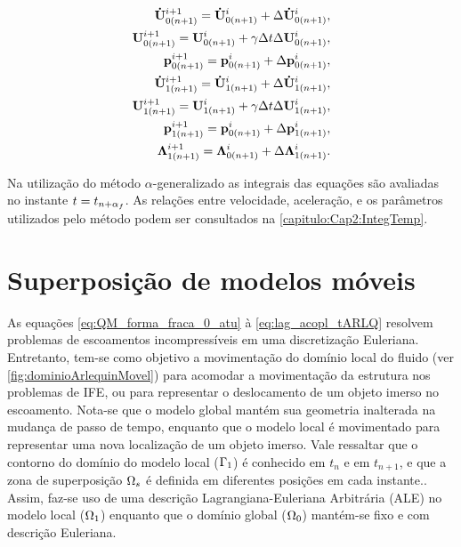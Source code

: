 \begin{align}
	\mathbf{\dot{U}}_{0(n+1)}^{i+1} = \mathbf{\dot{U}}_{0(n+1)}^{i} + \Delta\mathbf{\dot{U}}_{0(n+1)}^{i}, \label{eq:atu_acel_0} \\ 
	\mathbf{U}_{0(n+1)}^{i+1} = \mathbf{U}_{0(n+1)}^{i} + \gamma \Delta t \Delta\mathbf{U}_{0(n+1)}^{i},\label{eq:atu_vel_0}\\
	\mathbf{p}_{0(n+1)}^{i+1} = \mathbf{p}_{0(n+1)}^{i} + \Delta\mathbf{p}_{0(n+1)}^{i}, \label{eq:atu_press_0} \\
	\mathbf{\dot{U}}_{1(n+1)}^{i+1} = \mathbf{\dot{U}}_{1(n+1)}^{i} + \Delta\mathbf{\dot{U}}_{1(n+1)}^{i}, \label{eq:atu_acel_1} \\ 
	\mathbf{U}_{1(n+1)}^{i+1} = \mathbf{U}_{1(n+1)}^{i} + \gamma \Delta t \Delta\mathbf{U}_{1(n+1)}^{i},\label{eq:atu_vel_1}\\
	\mathbf{p}_{1(n+1)}^{i+1} = \mathbf{p}_{0(n+1)}^{i} + \Delta\mathbf{p}_{1(n+1)}^{i}, \label{eq:atu_press_1} \\
	\boldsymbol{\Lambda}_{1(n+1)}^{i+1} = \boldsymbol{\Lambda}_{0(n+1)}^{i} + \Delta\boldsymbol{\Lambda}_{1(n+1)}^{i}. \label{eq:atu_lag_mult}
\end{align}

Na utilização do método $\alpha$-generalizado as integrais das equações são avaliadas no instante $t = t_{n+\alpha_f}$. As relações entre velocidade, aceleração, e os parâmetros utilizados pelo método podem ser consultados na \autoref{capitulo:Cap2:IntegTemp}.



\section{Superposição de modelos móveis}

As equações \autoref{eq:QM_forma_fraca_0_atu} à \autoref{eq:lag_acopl_tARLQ} resolvem problemas de escoamentos incompressíveis em uma discretização Euleriana. Entretanto, tem-se como objetivo a movimentação do domínio local do fluido (ver \autoref{fig:dominioArlequinMovel}) para acomodar a movimentação da estrutura nos problemas de IFE, ou para representar o deslocamento de um objeto imerso no escoamento. Nota-se que o modelo global mantém sua geometria inalterada na mudança de passo de tempo, enquanto que o modelo local é movimentado para representar uma nova localização de um objeto imerso. Vale ressaltar que o contorno do domínio do modelo local ($\Gamma_1$) é conhecido em $t_n$ e em $t_{n+1}$, e que a zona de superposição $\Omega_s$ é definida em diferentes posições em cada instante.. Assim, faz-se uso de uma descrição Lagrangiana-Euleriana Arbitrária (ALE) no modelo local ($\Omega_1$) enquanto que o domínio global ($\Omega_0$) mantém-se fixo e com descrição Euleriana. 

